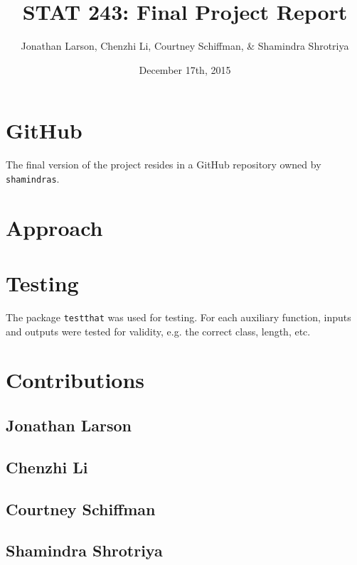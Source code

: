 \documentclass{article}
\begin{document}
\title{STAT 243: Final Project Report}
\author{Jonathan Larson, Chenzhi Li, Courtney Schiffman, \& Shamindra Shrotriya}
\date{December 17th, 2015}

\maketitle

\section{GitHub}

The final version of the project resides in a GitHub repository owned by
\texttt{shamindras}.

\section{Approach}



\section{Testing}

The package \texttt{testthat} was used for testing.
For each auxiliary function, inputs and outputs were tested for validity,
e.g. the correct class, length, etc.

\section{Contributions}

\subsection{Jonathan Larson}



\subsection{Chenzhi Li}



\subsection{Courtney Schiffman}



\subsection{Shamindra Shrotriya}
\end{document}
